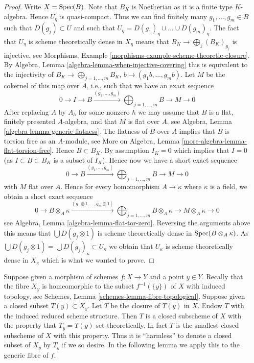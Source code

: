 \begin{proof}
\medskip\noindent
Write $X = \mathop{\rm Spec}(B)$. Note that $B_K$ is Noetherian as it is a
finite type $K$-algebra. Hence $U_\eta$ is quasi-compact. Thus we can
find finitely many $g_1, \ldots, g_m \in B$ such that $D(g_j) \subset U$
and such that $U_\eta = D(g_1)_\eta \cup \ldots \cup D(g_m)_\eta$.
The fact that $U_\eta$ is scheme theoretically dense in
$X_\eta$ means that $B_K \to \bigoplus_j (B_K)_{g_j}$
is injective, see
Morphisms, Example \ref{morphisms-example-scheme-theoretic-closure}.
By
Algebra, Lemma \ref{algebra-lemma-when-injective-covering}
this is equivalent to the injectivity of
$B_K \to \bigoplus\nolimits_{j = 1, \ldots, m} B_K$,
$b \mapsto (g_1b, \ldots, g_mb)$. Let $M$ be the cokernel of this
map over $A$, i.e., such that we have an exact sequence
$$
0 \to I \to B \xrightarrow{(g_1, \ldots, g_m)}
\bigoplus\nolimits_{j = 1, \ldots, m} B \to M \to 0
$$
After replacing $A$ by $A_h$ for some nonzero $h$ we may assume that $B$
is a flat, finitely presented $A$-algebra, and that $M$
is flat over $A$, see
Algebra, Lemma \ref{algebra-lemma-generic-flatness}.
The flatness of $B$ over $A$ implies that $B$ is torsion free as an
$A$-module, see
More on Algebra, Lemma \ref{more-algebra-lemma-flat-torsion-free}.
Hence $B \subset B_K$. By assumption $I_K = 0$ which implies that $I = 0$
(as $I \subset B \subset B_K$ is a subset of $I_K$). Hence now
we have a short exact sequence
$$
0 \to B \xrightarrow{(g_1, \ldots, g_m)}
\bigoplus\nolimits_{j = 1, \ldots, m} B \to M \to 0
$$
with $M$ flat over $A$. Hence for every homomorphism $A \to \kappa$ where
$\kappa$ is a field, we obtain a short exact sequence
$$
0 \to B \otimes_A \kappa \xrightarrow{(g_1 \otimes 1, \ldots, g_m \otimes 1)}
\bigoplus\nolimits_{j = 1, \ldots, m} B \otimes_A \kappa \to
M \otimes_A \kappa \to 0
$$
see
Algebra, Lemma \ref{algebra-lemma-flat-tor-zero}.
Reversing the arguments above
this means that $\bigcup D(g_j \otimes 1)$ is scheme
theoretically dense in $\mathop{\rm Spec}(B \otimes_A \kappa)$.
As $\bigcup D(g_j \otimes 1) = \bigcup D(g_j)_\kappa \subset U_\kappa$
we obtain that $U_\kappa$ is scheme theoretically dense in $X_\kappa$
which is what we wanted to prove.
\end{proof}

\noindent
Suppose given a morphism of schemes $f : X \to Y$ and
a point $y \in Y$. Recally that the fibre $X_y$ is homeomorphic
to the subset $f^{-1}(\{y\})$ of $X$ with induced topology, see
Schemes, Lemma \ref{schemes-lemma-fibre-topological}.
Suppose given a closed subset $T(y) \subset X_y$.
Let $T$ be the closure of $T(y)$ in $X$.
Endow $T$ with the induced reduced scheme structure.
Then $T$ is a closed subscheme of $X$ with the property
that $T_y = T(y)$ set-theoretically. In fact $T$ is the smallest
closed subscheme of $X$ with this property. Thus it is ``harmless''
to denote a closed subset of $X_y$ by $T_y$ if we so desire.
In the following lemma we apply this to the generic fibre of $f$.

